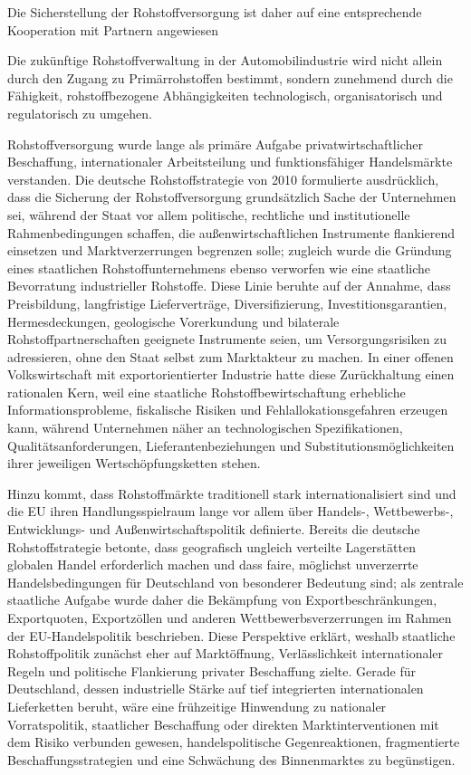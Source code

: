 \documentclass[12pt,a4paper,oneside]{book} %
\begin{document}
{Die Sicherstellung der Rohstoffversorgung ist daher auf eine entsprechende Kooperation mit Partnern angewiesen

Die zukünftige Rohstoffverwaltung in der Automobilindustrie wird nicht allein durch den Zugang zu Primärrohstoffen bestimmt, sondern zunehmend durch die Fähigkeit, rohstoffbezogene Abhängigkeiten technologisch, organisatorisch und regulatorisch zu umgehen.



Rohstoffversorgung wurde lange als primäre Aufgabe privatwirtschaftlicher Beschaffung, internationaler Arbeitsteilung und funktionsfähiger Handelsmärkte verstanden. Die deutsche Rohstoffstrategie von 2010 formulierte ausdrücklich, dass die Sicherung der Rohstoffversorgung grundsätzlich Sache der Unternehmen sei, während der Staat vor allem politische, rechtliche und institutionelle Rahmenbedingungen schaffen, die außenwirtschaftlichen Instrumente flankierend einsetzen und Marktverzerrungen begrenzen solle; zugleich wurde die Gründung eines staatlichen Rohstoffunternehmens ebenso verworfen wie eine staatliche Bevorratung industrieller Rohstoffe. Diese Linie beruhte auf der Annahme, dass Preisbildung, langfristige Lieferverträge, Diversifizierung, Investitionsgarantien, Hermesdeckungen, geologische Vorerkundung und bilaterale Rohstoffpartnerschaften geeignete Instrumente seien, um Versorgungsrisiken zu adressieren, ohne den Staat selbst zum Marktakteur zu machen. In einer offenen Volkswirtschaft mit exportorientierter Industrie hatte diese Zurückhaltung einen rationalen Kern, weil eine staatliche Rohstoffbewirtschaftung erhebliche Informationsprobleme, fiskalische Risiken und Fehlallokationsgefahren erzeugen kann, während Unternehmen näher an technologischen Spezifikationen, Qualitätsanforderungen, Lieferantenbeziehungen und Substitutionsmöglichkeiten ihrer jeweiligen Wertschöpfungsketten stehen.

Hinzu kommt, dass Rohstoffmärkte traditionell stark internationalisiert sind und die EU ihren Handlungsspielraum lange vor allem über Handels-, Wettbewerbs-, Entwicklungs- und Außenwirtschaftspolitik definierte. Bereits die deutsche Rohstoffstrategie betonte, dass geografisch ungleich verteilte Lagerstätten globalen Handel erforderlich machen und dass faire, möglichst unverzerrte Handelsbedingungen für Deutschland von besonderer Bedeutung sind; als zentrale staatliche Aufgabe wurde daher die Bekämpfung von Exportbeschränkungen, Exportquoten, Exportzöllen und anderen Wettbewerbsverzerrungen im Rahmen der EU-Handelspolitik beschrieben. Diese Perspektive erklärt, weshalb staatliche Rohstoffpolitik zunächst eher auf Marktöffnung, Verlässlichkeit internationaler Regeln und politische Flankierung privater Beschaffung zielte. Gerade für Deutschland, dessen industrielle Stärke auf tief integrierten internationalen Lieferketten beruht, wäre eine frühzeitige Hinwendung zu nationaler Vorratspolitik, staatlicher Beschaffung oder direkten Marktinterventionen mit dem Risiko verbunden gewesen, handelspolitische Gegenreaktionen, fragmentierte Beschaffungsstrategien und eine Schwächung des Binnenmarktes zu begünstigen.

}
\end{document}
